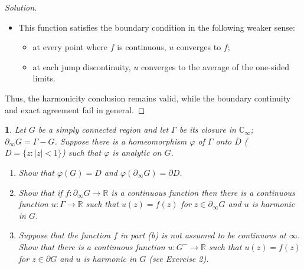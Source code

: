 \documentclass[12pt, a4paper]{report}
\theoremstyle{spaced}
\newtheorem{exercise}{}
\newcommand{\setexercise}[1]{\setcounter{exercise}{#1-1}}
\begin{document}
\begin{proof}[Solution]
\begin{itemize}
		\item This function satisfies the boundary condition in the following weaker sense:
		      \begin{itemize}
			      \item at every point where $f$ is continuous, $u$ converges to $f$;
			      \item at each jump discontinuity, $u$ converges to the average of the one-sided limits.
		      \end{itemize}
	\end{itemize}

	Thus, the harmonicity conclusion remains valid, while the boundary continuity and exact agreement fail in general.
\end{proof}

\setexercise{4}
\begin{exercise}
	Let $G$ be a simply connected region and let $\Gamma$ be its closure in $\mathbb{C}_\infty$; $\partial_\infty G=\Gamma - G$. Suppose there is a homeomorphism $\varphi$ of $\Gamma$ onto $\overline{D}$ ($D=\{z:|z|<1\}$) such that $\varphi$ is analytic on $G$.

	\begin{enumerate}
		\item[(a)] Show that $\varphi(G)=D$ and $\varphi(\partial_\infty G)=\partial D$.
		\item[(b)] Show that if $f:\partial_\infty G\to \mathbb{R}$ is a continuous function then there is a continuous function $u:\Gamma\to \mathbb{R}$ such that $u(z)=f(z)$ for $z\in \partial_\infty G$ and $u$ is harmonic in $G$.
		\item[(c)] Suppose that the function $f$ in part (b) is not assumed to be continuous at $\infty$. Show that there is a continuous function $u:G^-\to \mathbb{R}$ such that $u(z)=f(z)$ for $z\in \partial G$ and $u$ is harmonic in $G$ (see Exercise 2).
	\end{enumerate}
\end{exercise}
\end{document}
